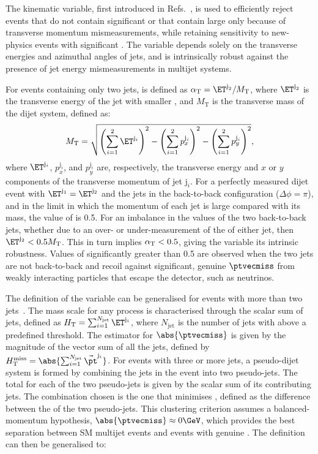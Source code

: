 The \alphat kinematic variable, first introduced in
Refs.~\cite{Randall:2008rw, RA1Paper}, is used to efficiently reject
events that do not contain significant \ptvecmiss or that contain
large \ptvecmiss only because of transverse momentum mismeasurements,
while retaining sensitivity to new-physics events with significant
\ptvecmiss. The \alphat variable depends solely on the transverse
energies and azimuthal angles of jets, and is intrinsically robust
against the presence of jet energy mismeasurements in multijet
systems.

For events containing only two jets, \alphat is defined as $\alphat =
\ET^{\text j_2}/M_\mathrm{T}$, where $\ET^{\text j_2}$ is the
transverse energy of the jet with smaller \ET, and $M_\mathrm{T}$ is
the transverse mass of the dijet system, defined as:
\begin{equation}
  \label{eq:mt}
  M_\mathrm{T} = \sqrt{ \left( \sum_{i=1}^2 \ET^{\mathrm{j}_i}
    \right)^2 - \left( \sum_{i=1}^2 p_x^{\mathrm{j}_i} \right)^2 - \left(
      \sum_{i=1}^2 p_y^{\mathrm{j}_i} \right)^2},
\end{equation}
where $\ET^{\mathrm{j}_i}$, $p_x^{\mathrm{j}_i}$, and
$p_y^{\mathrm{j}_i}$ are, respectively, the transverse energy and $x$
or $y$ components of the transverse momentum of jet $\mathrm{j}_i$.
For a perfectly measured dijet event with $\ET^{\mathrm{j}_1} =
\ET^{\mathrm{j}_2}$ and the jets in the back-to-back configuration
($\Delta\phi = \pi$), and in the limit in which the momentum of each
jet is large compared with its mass, the value of \alphat is 0.5.  For
an imbalance in the \ET values of the two back-to-back jets, whether
due to an over- or under-measurement of the \ET of either jet, then
$\ET^{\mathrm{j}_2} < 0.5M_\mathrm{T}$. This in turn implies $\alpha_\mathrm{T}
< 0.5$, giving the variable its intrinsic robustness. Values of
\alphat significantly greater than 0.5 are observed when the two jets
are not back-to-back and recoil against significant, genuine
$\ptvecmiss$ from weakly interacting particles that escape the
detector, such as neutrinos.

The definition of the \alphat variable can be generalised for events
with more than two jets~\cite{RA1Paper}. The mass scale for any
process is characterised through the scalar \ET sum of jets, defined
as $\scalht = \sum_{i=1}^{N_\text{jet}} \ET^{\mathrm{j}_i}$, where
$N_\text{jet}$ is the number of jets with \ET above a predefined
threshold. The estimator for $\abs{\ptvecmiss}$ is given by the
magnitude of the vector \pt sum of all the jets, defined by $\HTmiss =
\abs{\sum_{i=1}^{N_\text{jet}} \vec{\pt}^{\mathrm{j}_i}}$. For events
with three or more jets, a pseudo-dijet system is formed by combining
the jets in the event into two pseudo-jets. The total \scalht for each
of the two pseudo-jets is given by the scalar \ET sum of its
contributing jets. The combination chosen is the one that minimises
\dht, defined as the difference between the \scalht of the two
pseudo-jets. This clustering criterion assumes a balanced-momentum
hypothesis, $\abs{\ptvecmiss} \approx 0\GeV$, which provides the best
separation between SM multijet events and events with genuine
\ptvecmiss. The \alphat definition can then be generalised to:

